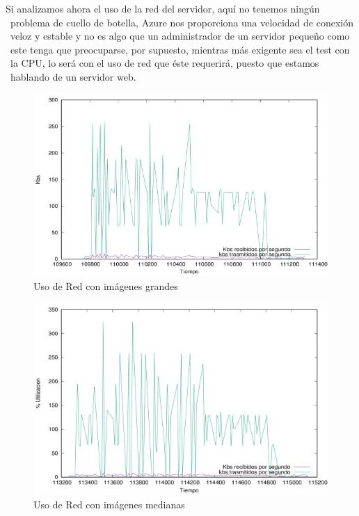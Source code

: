 \documentclass[11pt,twoside,a4paper]{book}
\begin{document}
Si analizamos ahora el uso de la red del servidor, aquí no tenemos ningún \
problema de cuello de botella, Azure nos proporciona una velocidad de conexión \
veloz y estable y no es algo que un administrador de un servidor pequeño como \
este tenga que preocuparse, por supuesto, mientras más exigente sea el test con \
la CPU, lo será con el uso de red que éste requerirá, puesto que estamos \
hablando de un servidor web. \newline

\begin{figure}[H]
   \includegraphics[width=\textwidth]{redgrandes.jpg}
   \caption{Uso de Red con imágenes grandes}
   \label{red1}
\end{figure}

\begin{figure}[H]
   \includegraphics[width=\textwidth]{redmedianos.jpg}
   \caption{Uso de Red con imágenes medianas}
   \label{red2}
\end{figure}
\end{document}
